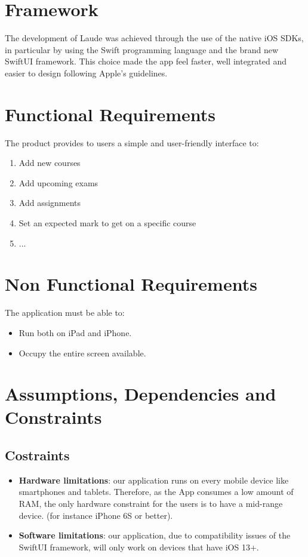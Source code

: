 \documentclass[numbers=noenddot, 12pt, a4paper, oneside]{scrbook}
\begin{document}
\section{Framework}
The development of Laude was achieved through the use of the native iOS SDKs, in particular by using the Swift programming language and the brand new SwiftUI framework. This choice made the app feel faster, well integrated and easier to design following Apple's guidelines.

\section{Functional Requirements}
The product provides to users a simple and user-friendly interface to:
\begin{enumerate}
	\item Add new courses
	\item Add upcoming exams
	\item Add assignments
	\item Set an expected mark to get on a specific course
	\item ...
\end{enumerate}
\section{Non Functional Requirements}
The application must be able to:
\begin{itemize}
	\item Run both on iPad and iPhone.
	\item Occupy the entire screen available.
\end{itemize}

\section{Assumptions, Dependencies and Constraints\\}

\subsection*{Costraints}

\begin{itemize}
	\item \textbf{Hardware limitations}: our application runs on every mobile device like smartphones and tablets. Therefore, as the App consumes a low amount of RAM, the only hardware constraint for the users is to have a mid-range device. (for instance iPhone 6S or better).
	\item \textbf{Software limitations}: our application, due to compatibility issues of the SwiftUI framework, will only work on devices that have iOS 13+.
\end{itemize}
\end{document}
